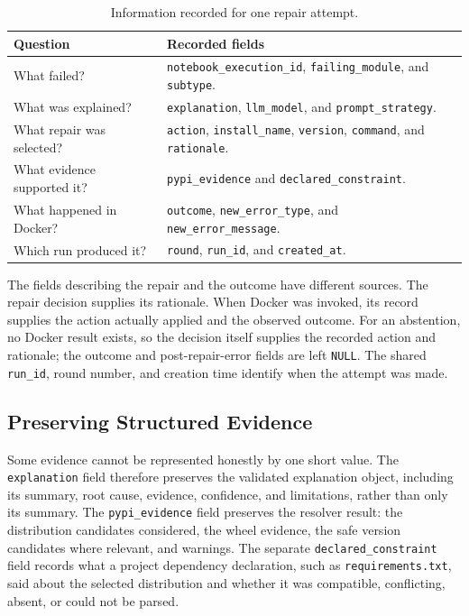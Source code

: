 \begin{table}[htbp]
\centering
\small
\caption{Information recorded for one repair attempt.}
\label{tab:m-repair-attempt-fields}
\begin{tabular}{p{}p{}}
\hline
\textbf{Question} & \textbf{Recorded fields} \\
\hline
What failed? & \texttt{notebook\_execution\_id}, \texttt{failing\_module}, and \texttt{subtype}. \\
What was explained? & \texttt{explanation}, \texttt{llm\_model}, and \texttt{prompt\_strategy}. \\
What repair was selected? & \texttt{action}, \texttt{install\_name}, \texttt{version}, \texttt{command}, and \texttt{rationale}. \\
What evidence supported it? & \texttt{pypi\_evidence} and \texttt{declared\_constraint}. \\
What happened in Docker? & \texttt{outcome}, \texttt{new\_error\_type}, and \texttt{new\_error\_message}. \\
Which run produced it? & \texttt{round}, \texttt{run\_id}, and \texttt{created\_at}. \\
\hline
\end{tabular}
\end{table}

The fields describing the repair and the outcome have different sources.
The repair decision supplies its rationale. When Docker was invoked, its
record supplies the action actually applied and the observed outcome. For an
abstention, no Docker result exists, so the decision itself supplies the
recorded action and rationale; the outcome and post-repair-error fields are
left \texttt{NULL}. The shared \texttt{run\_id}, round number, and creation
time identify when the attempt was made.

\subsection{Preserving Structured Evidence}
\label{sec:m-resultlogger-json}

Some evidence cannot be represented honestly by one short value. The
\texttt{explanation} field therefore preserves the validated explanation
object, including its summary, root cause, evidence, confidence, and
limitations, rather than only its summary. The \texttt{pypi\_evidence} field
preserves the resolver result: the distribution candidates considered, the
wheel evidence, the safe version candidates where relevant, and warnings.
The separate \texttt{declared\_constraint} field records what a project
dependency declaration, such as \texttt{requirements.txt}, said about the
selected distribution and whether it was compatible, conflicting, absent, or
could not be parsed.

